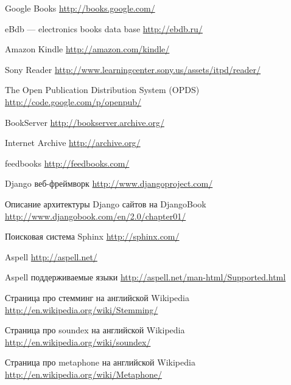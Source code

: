 \begin{thebibliography}{99}

 Google Books \url{http://books.google.com/}

 eBdb --- electronics books data base \url{http://ebdb.ru/}

 Amazon Kindle \url{http://amazon.com/kindle/}

 Sony Reader \url{http://www.learningcenter.sony.us/assets/itpd/reader/}

 The Open Publication Distribution System (OPDS) \url{http://code.google.com/p/openpub/}

 BookServer \url{http://bookserver.archive.org/}

 Internet Archive \url{http://archive.org/}

 feedbooks \url{http://feedbooks.com/}

 Django веб-фреймворк \url{http://www.djangoproject.com/}

 Описание архитектуры Django сайтов на DjangoBook \url{http://www.djangobook.com/en/2.0/chapter01/}

 Поисковая система Sphinx \url{http://sphinx.com/}

 Aspell \url{http://aspell.net/}

 Aspell поддерживаемые языки \url{http://aspell.net/man-html/Supported.html}

 Страница про стемминг на английской Wikipedia \url{http://en.wikipedia.org/wiki/Stemming/}

 Страница про soundex на английской Wikipedia \url{http://en.wikipedia.org/wiki/soundex/}

 Страница про metaphone на английской Wikipedia \url{http://en.wikipedia.org/wiki/Metaphone/}




\end{thebibliography}